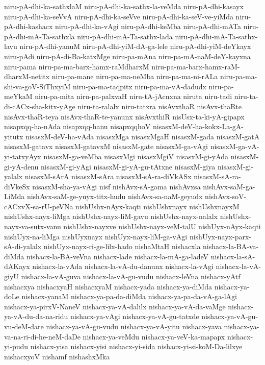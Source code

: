 {niru-pA-dhi-ka-sathxlaM
niru-pA-dhi-ka-sathx-la-veMda
niru-pA-dhi-kasayx
niru-pA-dhi-ka-seVvA
niru-pA-dhi-ka-seVve
niru-pA-dhi-ka-seV-ve-yiMda
niru-pA-dhi-kashacx
niru-pA-dhi-ka-vAgi
niru-pA-dhi-keMba
niru-pA-dhi-mATa
niru-pA-dhi-mA-Ta-sathxla
niru-pA-dhi-mA-Ta-sathx-lada
niru-pA-dhi-mA-Ta-sathx-lavu
niru-pA-dhi-yanuM
niru-pA-dhi-yiM-dA-ga-lele
niru-pA-dhi-yiM-deYkayx
niru-pAdi
niru-pA-di-Ba-katxMge
niru-pa-mAna
niru-pa-mA-naM-deY-kayxna
niru-pama
niru-pa-ma-barx-hamx-raMdharxM
niru-pa-ma-barx-hamx-raM-dharxM-netitx
niru-pa-mane
niru-pa-ma-neMba
niru-pa-ma-ni-rALa
niru-pa-ma-shi-va-goV-SiThxyiM
niru-pa-ma-taqpitx
niru-pa-ma-vA-dadudx
niru-pa-meYkaM
niru-pa-mita
niru-pa-palxvaH
niru-tA-jAcnxna
niruta
niru-tadi
niru-ta-di-cACx-sha-kitx-yAge
niru-ta-ralalx
niru-tatxra
nisAvxthaR
nisAvx-thaRte
nisAvx-thaR-teya
nisAvx-thaR-te-yanunx
nisAvxthiR
nisUsx-ta-ki-yA-gipapx
nisapxqq-ha-nAda
nisapxqq-hanu
nisapxqqhoV
nisasxM-deV-ha-kokx-La-gA-yitutx
nisasxM-deV-ha-vAda
nisasxMga
nisasxMgaH
nisasxM-gada
nisasxM-gatA
nisasxM-gatavx
nisasxM-gatavxM
nisasxM-gate
nisasxM-ga-vAgi
nisasxM-ga-vA-yi-tatxyAyx
nisasxM-ga-veMba
nisasxMgi
nisasxMgiV
nisasxM-gi-yAda
nisasxM-gi-yA-denu
nisasxM-gi-yAgi
nisasxM-gi-yA-gu-tAtxne
nisasxM-giya
nisasxM-gi-yalalx
nisasxM-sArA
nisasxM-sAra
nisasxM-sA-ra-diVkASx
nisasxM-sA-ra-diVkeSx
nisasxM-sha-ya-vAgi
nisf
nishAvx-sA-gama
nishAvxsa
nishAvx-saM-ga-LiMda
nishAvx-saM-ge-yuyx-titx-hudu
nishAvx-sa-naM-geyudx
nishAvx-soV-cACxvX-sa-rU-peVNa
nishUshx-nAyx-kaqti
nishUshxnayx
nishUshxnayxM
nishUshx-nayx-liMga
nishUshx-nayx-liM-gavu
nishUshx-nayx-nalalx
nishUshx-nayx-va-sutx-vanu
nishUshx-nayxve
nishUshx-nayx-veM-talU
nishUyx-nAyx-kaqti
nishUyx-na-liMga
nishUyxnayx
nishUyx-nayx-liM-ga-vAgi
nishUyx-nayx-parx-sA-di-yalalx
nishUyx-nayx-ri-ge-lilx-hado
nishaMtaH
nishacxla
nishacx-la-BA-va-diMda
nishacx-la-BA-veVna
nishacx-lade
nishacx-la-mA-ga-ladeV
nishacx-la-sA-dAKayx
nishacx-la-vAda
nishacx-la-vA-du-danunx
nishacx-la-vAgi
nishacx-la-vA-giyU
nishacx-la-vA-guva
nishacx-la-vA-gu-vudu
nishacx-leVna
nishacx-yAtf
nishacxya
nishacxyaH
nishacxyaM
nishacx-yada
nishacx-ya-diMda
nishacx-ya-doLe
nishacx-yanaM
nishacx-ya-pa-da-diMda
nishacx-ya-pa-da-vA-ga-lAgi
nishacx-ya-pirxV-NaneV
nishacx-ya-vA-dalilx
nishacx-ya-vA-da-vaMge
nishacx-ya-vA-du-da-na-ridu
nishacx-ya-vAgi
nishacx-ya-vA-gu-tatxde
nishacx-ya-vA-gu-vu-deM-dare
nishacx-ya-vA-gu-vudu
nishacx-ya-vA-yitu
nishacx-yava
nishacx-ya-va-na-ri-di-he-neM-daDe
nishacx-ya-veMdu
nishacx-ya-veV-ka-mapapx
nishacx-yi-pudu
nishacx-yisa
nishacx-yisi
nishacx-yi-sida
nishacx-yi-si-koM-Da-lilxye
nishacxyoV
nishamf
nishashxMka
}
